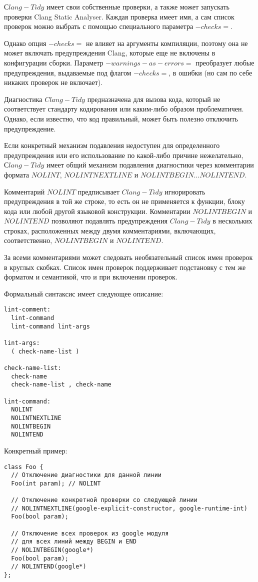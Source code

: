 \documentclass{mipt-thesis-bs}
\begin{document}
$Сlang-Tidy$ имеет свои собственные проверки, а также может запускать 
проверки Clang Static Analyser. Каждая проверка имеет имя, 
а сам список проверок можно выбрать с помощью специального параметра $-checks=$.

Однако опция $-checks=$ не влияет на аргументы компиляции, поэтому она 
не может включать предупреждения Clang, которые еще не включены в 
конфигурации сборки. Параметр $-warnings-as-errors=$ преобразует 
любые предупреждения, выдаваемые под флагом $-checks=$, в ошибки 
(но сам по себе никаких проверок не включает).

Диагностика $Clang-Tidy$ предназначена для вызова кода, который не 
соответствует стандарту кодирования или каким-либо образом проблематичен. 
Однако, если известно, что код правильный, может быть полезно отключить предупреждение.

Если конкретный механизм подавления недоступен для определенного 
предупреждения или его использование по какой-либо причине 
нежелательно, $Сlang-Tidy$ имеет общий механизм подавления 
диагностики через комментарии формата $NOLINT$,
$NOLINTNEXTLINE$ и $NOLINTBEGIN… NOLINTEND$.

Комментарий $NOLINT$ предписывает $Clang-Tidy$ игнорировать предупреждения 
в той же строке, то есть он не применяется к функции, блоку кода или любой 
другой языковой конструкции.
Комментарии $NOLINTBEGIN$ и $NOLINTEND$ позволяют подавлять предупреждения 
$Clang-Tidy$ в нескольких строках, расположенных между двумя 
комментариями, включающих, соответственно, $NOLINTBEGIN$ и $NOLINTEND$.

За всеми комментариями может следовать необязательный список имен 
проверок в круглых скобках. 
Список имен проверок поддерживает подстановку с тем же форматом 
и семантикой, что и при включении проверок.

Формальный синтаксис имеет следующее описание:
\begin{verbatim}
lint-comment:
  lint-command
  lint-command lint-args

lint-args:
  ( check-name-list )

check-name-list:
  check-name
  check-name-list , check-name

lint-command:
  NOLINT
  NOLINTNEXTLINE
  NOLINTBEGIN
  NOLINTEND
\end{verbatim}

Конкретный пример:

\begin{verbatim}
class Foo {
  // Отключение диагностики для данной линии
  Foo(int param); // NOLINT

  // Отключение конкретной проверки со следующей линии
  // NOLINTNEXTLINE(google-explicit-constructor, google-runtime-int)
  Foo(bool param);

  // Отключение всех проверок из google модуля
  // для всех линий между BEGIN и END
  // NOLINTBEGIN(google*)
  Foo(bool param);
  // NOLINTEND(google*)
};
\end{verbatim}
\end{document}
